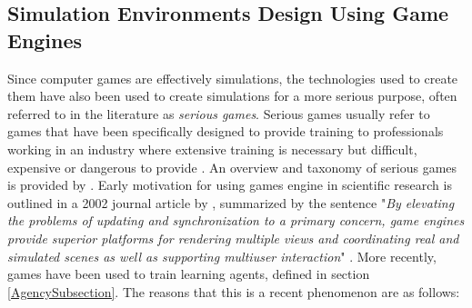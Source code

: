 \subsection{Simulation Environments Design Using Game Engines}\label{GameEngineReview}
Since computer games are effectively simulations, the technologies used to create them have also been used to create simulations for a more serious purpose, often referred to in the literature as \textit{serious games}. Serious games usually refer to games that have been specifically designed to provide training to professionals working in an industry where extensive training is necessary but difficult, expensive or dangerous to provide \cite{Sobke2016SeriousEngines}. An overview and taxonomy of serious games is provided by \citeauthor{Laamarti2014AnGames} \cite{Laamarti2014AnGames}. Early motivation for using games engine in scientific research is outlined in a 2002 journal article by \citeauthor{Lewis2002GameEnginesInScientificResearch}, summarized by the sentence "\textit{By elevating the problems of updating and synchronization to a primary concern, game engines provide superior platforms for rendering multiple views and coordinating real and simulated scenes as well as supporting multiuser interaction}" \cite{Lewis2002GameEnginesInScientificResearch}.  More recently, games have been used to train learning agents, defined in section \ref{AgencySubsection}. The reasons that this is a recent phenomenon are as follows:
